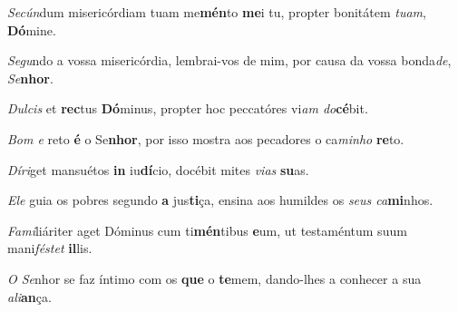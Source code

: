 \begin{greenumerate}
  \setcounter{enumi}{1}


  \item \textit{Secún}dum misericórdiam tuam me\textbf{mén}to \textbf{me}i tu, {\GreStar} propter bonitátem \textit{tuam}, \textbf{Dó}mine. 

  \switchcolumn\setcounter{enumi}{1}

  \item \textit{Segu}ndo a vossa misericórdia, lembrai-vos de mim, {\GreStar} por causa da vossa bonda\textit{de}, \textit{Se}\textbf{nhor}. 

  \switchcolumn*


  \item \textit{Dulcis} et \textbf{rec}tus \textbf{Dó}minus, {\GreStar} propter hoc peccatóres vi\textit{am do}\textbf{cé}bit. 

  \switchcolumn%

  \item \textit{Bom e} reto \textbf{é} o Se\textbf{nhor}, {\GreStar} por isso mostra aos pecadores o ca\textit{minho} \textbf{re}to. 

  \switchcolumn*


  \item \textit{Díri}get mansuétos \textbf{in} iu\textbf{dí}cio, {\GreStar} docébit mites \textit{vias} \textbf{su}as. 

  \switchcolumn%

  \item \textit{Ele} guia os pobres segundo \textbf{a} jus\textbf{ti}ça, {\GreStar} ensina aos humildes os \textit{seus ca}\textbf{mi}nhos. 

  \switchcolumn*


  \item \textit{Fami}liáriter aget Dóminus cum ti\textbf{mén}tibus \textbf{e}um, {\GreStar} ut testaméntum suum mani\textit{féstet} \textbf{il}lis. 

  \switchcolumn%

  \item \textit{O Se}nhor se faz íntimo com os \textbf{que} o \textbf{te}mem, {\GreStar} dando-lhes a conhecer a sua \textit{ali}\textbf{an}ça. 

\end{greenumerate}